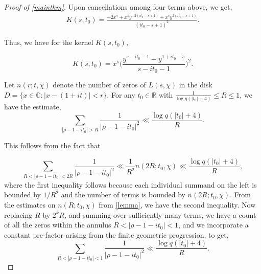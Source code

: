 \documentclass[10pt,a4paper]{amsart}
\begin{document}
\begin{proof}[Proof of \cref{mainthm}]
Upon cancellations among four terms above, we get, 
\begin{align}
    K(s,t_0)=\frac{-2x^s +x^s y^{-2(it_0 -s+1)} +x^s y^{2(it_0 -s +1)} }{(it_0 -s+1)^2}.
\end{align}

\noindent Thus, we have for the kernel $K(s,t_0)$,

\begin{equation}
K(s,t_0)=x^{s}\Big(\frac{y^{s-it_0 -1}- y^{1+it_0 -s}}{s-it_0 -1}\Big)^{2}.
\end{equation}


\bigskip 

 Let $n(r;t,\chi)$ denote the number of zeros of $L(s,\chi)$ in the disk $D= \{x\in \mathbb{C}:|x-(1+it)|<r\}$. For any $t_0 \in \mathbb{R}$ with $\frac{1}{\log q(|t_0|+4)}\leq R \leq 1$, we have the estimate,
\begin{equation}\label{impeq}
    \sum\limits_{|\rho -1-it_0|>R} \frac{1}{|\rho- 1-it_0|^{2}} \ll \frac{\log q(|t_0|+4)}{R}.
\end{equation}

\noindent This follows from the fact that 

\begin{equation}
    \sum\limits_{R<|\rho -1-it_0|<2R} \frac{1}{|\rho -1-it_0|^{2}} \ll \frac{1}{R^{2}} n(2R;t_0,\chi) \ll \frac{\log q(|t_0|+4)}{R},
\end{equation}
where the first inequality follows because each individual summand on the left is bounded by $1/R^{2}$ and the number of terms is bounded by $n(2R;t_0,\chi)$. From the estimates on $n(R;t_0,\chi)$ from \cref{lemma}, %
we have the second inequality. Now replacing $R$ by $2^{k}R$, and summing over sufficiently many terms, we have a count of all the zeros within the annulus $R<|\rho -1-it_0|<1$, and we incorporate a constant pre-factor arising from the finite geometric progression, to get,
\begin{equation}\label{eq16}
    \sum\limits_{R<|\rho -1-it_0|<1} \frac{1}{
    |\rho -1-it_0|^{2}}\ll \frac{\log q(|t_0|+4)}{R}.
\end{equation}


\end{proof}
\end{document}
